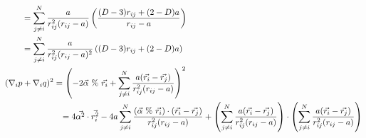 \documentclass[12pt]{article}
\begin{document}
\begin{align*}
& \hspace*{7mm} = \sum_{j\neq i}^N \frac{a}{r_{ij}^2(r_{ij}-a)} \left( \frac{(D-3)r_{ij}+(2-D)a}{r_{ij}-a}   \right)\\
& \hspace*{7mm} = \sum_{j\neq i}^N \frac{a}{r_{ij}^2(r_{ij}-a)^2} \left( (D-3)r_{ij}+(2-D)a   \right)\\
& (\nabla_i p + \nabla_i q)^2 = \left( -2 \vec{\alpha} \ \% \ \vec{r_i} + \sum_{j\neq i}^N \frac{a(\vec{r_i}-\vec{r_j})}{r_{ij}^2(r_{ij}-a)} \right)^2\\
& \hspace*{23mm} = 4 \vec{\alpha^2}\cdot\vec{r_i^2} - 4a \sum_{j\neq i}^N \frac{(\vec{\alpha} \ \% \ \vec{r_i}) \cdot (\vec{r_i}-\vec{r_j})}{r_{ij}^2(r_{ij}-a)} + \left( \sum_{j\neq i}^N \frac{a(\vec{r_i}-\vec{r_j})}{r_{ij}^2(r_{ij}-a)} \right) \cdot \left( \sum_{j\neq i}^N \frac{a(\vec{r_i}-\vec{r_j})}{r_{ij}^2(r_{ij}-a)} \right)
\end{align*}
\end{document}

